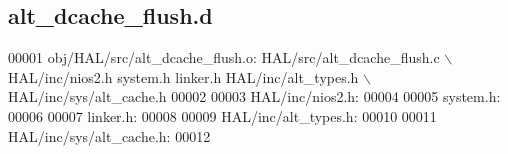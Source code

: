 \subsection{alt\+\_\+dcache\+\_\+flush.\+d}
\label{alt__dcache__flush_8d_source}

\begin{DoxyCode}
00001 obj/HAL/src/alt_dcache_flush.o: HAL/src/alt_dcache_flush.c \(\backslash\)
 HAL/inc/nios2.h system.h linker.h HAL/inc/alt\_types.h \(\backslash\)
 HAL/inc/sys/alt\_cache.h
00002 
00003 HAL/inc/nios2.h:
00004 
00005 system.h:
00006 
00007 linker.h:
00008 
00009 HAL/inc/alt\_types.h:
00010 
00011 HAL/inc/sys/alt\_cache.h:
00012 \end{DoxyCode}

